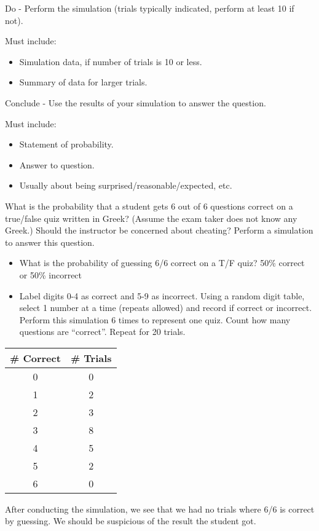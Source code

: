 \documentclass[../stats.tex]{subfiles}
\begin{document}
Do - Perform the simulation (trials typically indicated, perform at least 10 if not).

Must include:
\begin{itemize}
    \item Simulation data, if number of trials is 10 or less.
    \item Summary of data for larger trials.
\end{itemize}

Conclude - Use the results of your simulation to answer the question.

Must include:
\begin{itemize}
    \item Statement of probability.
    \item Answer to question.
    \item Usually about being surprised/reasonable/expected, etc.
\end{itemize}

\begin{example}
    What is the probability that a student gets 6 out of 6 questions correct on a true/false quiz written in Greek? (Assume the exam taker does not know any Greek.) Should the instructor be concerned about cheating? Perform a simulation to answer this question.

    \begin{itemize}
        \item What is the probability of guessing 6/6 correct on a T/F quiz?
        50\% correct or 50\% incorrect 
        \item Label digits 0-4 as correct and 5-9 as incorrect. Using a random digit table, select 1 number at a time (repeats allowed) and record if correct or incorrect. Perform this simulation 6 times to represent one quiz. Count how many questions are ``correct''. Repeat for 20 trials.
    \end{itemize}
    \begin{center}
        \begin{tabular}{c|c}
            \# Correct & \# Trials \\\hline 
            0 & 0\\
            1&2\\
            2&3\\
            3&8\\
            4&5\\
            5&2\\
            6&0
        \end{tabular}
    \end{center}
    After conducting the simulation, we see that we had no trials where 6/6 is correct by guessing. We should be suspicious of the result the student got.
\end{example}
\end{document}
